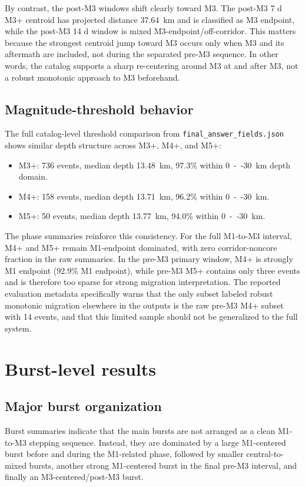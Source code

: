 \documentclass[11pt]{article}
\begin{document}
By contrast, the post-M3 windows shift clearly toward M3. The post-M3 7 d M3+ centroid has projected distance \SI{37.64}{km} and is classified as M3 endpoint, while the post-M3 14 d window is mixed M3-endpoint/off-corridor. This matters because the strongest centroid jump toward M3 occurs only when M3 and its aftermath are included, not during the separated pre-M3 sequence. In other words, the catalog supports a sharp re-centering around M3 at and after M3, not a robust monotonic approach to M3 beforehand.

\subsection{Magnitude-threshold behavior}
The full catalog-level threshold comparison from \texttt{final\_answer\_fields.json} shows similar depth structure across M3+, M4+, and M5+:
\begin{itemize}[leftmargin=1.5em]
    \item M3+: 736 events, median depth \SI{13.48}{km}, 97.3\% within \SI{0}{--}\SI{30}{km} depth domain.
    \item M4+: 158 events, median depth \SI{13.71}{km}, 96.2\% within \SI{0}{--}\SI{30}{km}.
    \item M5+: 50 events, median depth \SI{13.77}{km}, 94.0\% within \SI{0}{--}\SI{30}{km}.
\end{itemize}

The phase summaries reinforce this consistency. For the full M1-to-M3 interval, M4+ and M5+ remain M1-endpoint dominated, with zero corridor-noncore fraction in the raw summaries. In the pre-M3 primary window, M4+ is strongly M1 endpoint (92.9\% M1 endpoint), while pre-M3 M5+ contains only three events and is therefore too sparse for strong migration interpretation. The reported evaluation metadata specifically warns that the only subset labeled robust monotonic migration elsewhere in the outputs is the raw pre-M3 M4+ subset with 14 events, and that this limited sample should not be generalized to the full system.

\section{Burst-level results}
\subsection{Major burst organization}
Burst summaries indicate that the main bursts are not arranged as a clean M1-to-M3 stepping sequence. Instead, they are dominated by a large M1-centered burst before and during the M1-related phase, followed by smaller central-to-mixed bursts, another strong M1-centered burst in the final pre-M3 interval, and finally an M3-centered/post-M3 burst.
\end{document}
